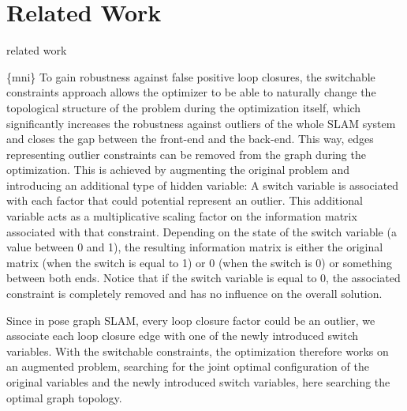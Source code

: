 \section{Related Work}
related work

\{mni\} To gain robustness against false positive loop closures, the
switchable constraints approach allows the optimizer to be able to naturally
change the topological structure of the problem during the optimization
itself, which significantly increases the robustness against outliers of the
whole SLAM system and closes the gap between the front-end and the back-end.
This way, edges representing outlier constraints can be removed from the graph
during the optimization. This is achieved by augmenting the original problem
and introducing an additional type of hidden variable: A switch variable is
associated with each factor that could potential represent an outlier. This
additional variable acts as a multiplicative scaling factor on the information
matrix associated with that constraint. Depending on the state of the switch
variable (a value between 0 and 1), the resulting information matrix is either
the original matrix (when the switch is equal to 1) or 0 (when the switch is
0) or something between both ends. Notice that if the switch variable is equal
to 0, the associated constraint is completely removed and has no influence on
the overall solution. 

Since in pose graph SLAM, every loop closure factor could be an outlier, we
associate each loop closure edge with one of the newly introduced switch
variables. With the switchable constraints, the optimization therefore works
on an augmented problem, searching for the joint optimal configuration of the
original variables and the newly introduced switch variables, here searching
the optimal graph topology. 
